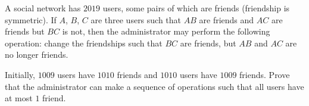 A social network has $2019$ users, some pairs of which are friends (friendship is symmetric).
If $A$, $B$, $C$ are three users such that $AB$ are friends and $AC$ are friends but $BC$ is not,
then the administrator may perform the following operation:
change the friendships such that $BC$ are friends, but $AB$ and $AC$ are no longer friends.

Initially, $1009$ users have $1010$ friends and $1010$ users have $1009$ friends.
Prove that the administrator can make a sequence of operations
such that all users have at most $1$ friend.